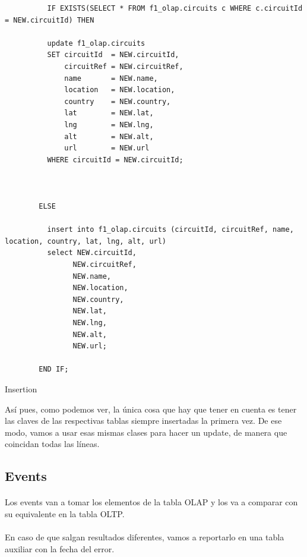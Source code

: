 \documentclass[a4paper 
,twoside
]{article}
\begin{document}
    \begin{listing}[H]
      \begin{verbatim}
          IF EXISTS(SELECT * FROM f1_olap.circuits c WHERE c.circuitId = NEW.circuitId) THEN

          update f1_olap.circuits
          SET circuitId  = NEW.circuitId,
              circuitRef = NEW.circuitRef,
              name       = NEW.name,
              location   = NEW.location,
              country    = NEW.country,
              lat        = NEW.lat,
              lng        = NEW.lng,
              alt        = NEW.alt,
              url        = NEW.url
          WHERE circuitId = NEW.circuitId;



        ELSE

          insert into f1_olap.circuits (circuitId, circuitRef, name, location, country, lat, lng, alt, url)
          select NEW.circuitId,
                NEW.circuitRef,
                NEW.name,
                NEW.location,
                NEW.country,
                NEW.lat,
                NEW.lng,
                NEW.alt,
                NEW.url;

        END IF;

      \end{verbatim}
      \caption{Insertion}
      \label{lst:insert}
    \end{listing}

    Así pues, como podemos ver, la única cosa que hay que tener en cuenta es tener las claves de las respectivas tablas siempre insertadas la primera vez. De ese modo, vamos a usar esas mismas clases para hacer un update, de manera que coincidan todas las líneas.
  \subsection{Events}
  \paragraph{}
  Los events van a tomar los elementos de la tabla OLAP y los va a comparar con su equivalente en la tabla OLTP.

  \paragraph{}
  En caso de que salgan resultados diferentes, vamos a reportarlo en una tabla auxiliar con la fecha del error.
\end{document}
